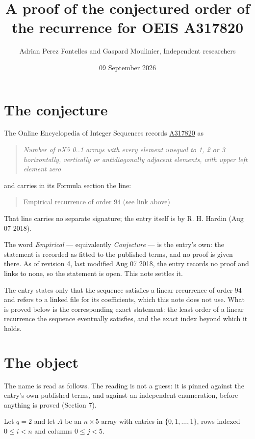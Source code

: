 \documentclass[11pt]{article}
\title{A proof of the conjectured order of the recurrence for OEIS A317820}
\author{Adrian Perez Fontelles and Gaspard Moulinier, Independent researchers}
\date{09 September 2026}
\theoremstyle{definition}
\begin{document}
\maketitle
\section{The conjecture}

The Online Encyclopedia of Integer Sequences records \href{https://oeis.org/A317820}{A317820} as

\begin{quote}\itshape Number of nX5 0..1 arrays with every element unequal to 1, 2 or 3 horizontally, vertically or antidiagonally adjacent elements, with upper left element zero\end{quote}

and carries in its Formula section the line:

\begin{quote}\ttfamily Empirical recurrence of order 94 (see link above)\end{quote}

That line carries no separate signature; the entry itself is by R. H. Hardin (Aug 07 2018).

The word {\itshape Empirical} --- equivalently {\itshape Conjecture} --- is the entry's own: the statement is recorded as fitted to the published terms, and no proof is given there. As of revision 4, last modified Aug 07 2018, the entry records no proof and links to none, so the statement is open. This note settles it.

The entry states only that the sequence satisfies a linear recurrence of order $94$ and refers to a linked file for its coefficients, which this note does not use. What is proved below is the corresponding exact statement: the least order of a linear recurrence the sequence eventually satisfies, and the exact index beyond which it holds.

\section{The object}

The name is read as follows. The reading is not a guess: it is pinned against the entry's own published terms, and against an independent enumeration, before anything is proved (Section 7).

Let $q = 2$ and let $A$ be an $n \times 5$ array with entries in $\{0,1,\dots,1\}$, rows indexed $0 \le i < n$ and columns $0 \le j < 5$.
\end{document}
